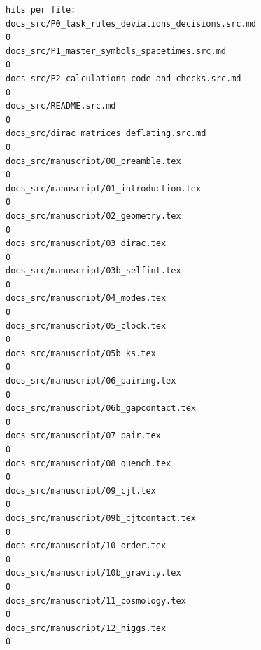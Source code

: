 \documentclass[
  10pt,
]{article}
\begin{document}
\begin{verbatim}
hits per file:
docs_src/P0_task_rules_deviations_decisions.src.md                                                             0
docs_src/P1_master_symbols_spacetimes.src.md                                                                   0
docs_src/P2_calculations_code_and_checks.src.md                                                                0
docs_src/README.src.md                                                                                         0
docs_src/dirac matrices deflating.src.md                                                                       0
docs_src/manuscript/00_preamble.tex                                                                            0
docs_src/manuscript/01_introduction.tex                                                                        0
docs_src/manuscript/02_geometry.tex                                                                            0
docs_src/manuscript/03_dirac.tex                                                                               0
docs_src/manuscript/03b_selfint.tex                                                                            0
docs_src/manuscript/04_modes.tex                                                                               0
docs_src/manuscript/05_clock.tex                                                                               0
docs_src/manuscript/05b_ks.tex                                                                                 0
docs_src/manuscript/06_pairing.tex                                                                             0
docs_src/manuscript/06b_gapcontact.tex                                                                         0
docs_src/manuscript/07_pair.tex                                                                                0
docs_src/manuscript/08_quench.tex                                                                              0
docs_src/manuscript/09_cjt.tex                                                                                 0
docs_src/manuscript/09b_cjtcontact.tex                                                                         0
docs_src/manuscript/10_order.tex                                                                               0
docs_src/manuscript/10b_gravity.tex                                                                            0
docs_src/manuscript/11_cosmology.tex                                                                           0
docs_src/manuscript/12_higgs.tex                                                                               0

\end{verbatim}
\end{document}
